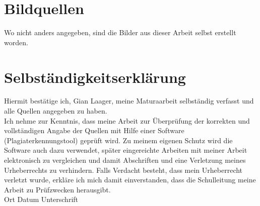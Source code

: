 \documentclass[11pt,DIV=10,final]{scrreprt} %
\begin{document}
\begin{appendix}
{\vspace*{3ex}
{\noindent \large \bfseries src/newtons\_method.rs}


\vspace*{3ex}
{\noindent \large \bfseries src/plot.rs}


\vspace*{3ex}
{\noindent \large \bfseries src/potentials.rs}


\vspace*{3ex}
{\noindent \large \bfseries src/tui.rs}


\vspace*{3ex}
{\noindent \large \bfseries src/turning\_points.rs}


\vspace*{3ex}
{\noindent \large \bfseries src/utils.rs}


\vspace*{3ex}
{\noindent \large \bfseries src/wave\_function\_builder.rs}


\vspace*{3ex}
{\noindent \large \bfseries src/wkb\_wave\_func.rs}


\end{appendix}
\chapter*{Bildquellen}
%
Wo nicht anders angegeben, sind die Bilder aus dieser Arbeit selbst erstellt worden.
%



%
\chapter*{Selbständigkeitserklärung}
%
Hiermit bestätige ich, Gian Laager, meine Maturaarbeit selbständig verfasst und alle Quellen angegeben zu haben.\\\newline
Ich nehme zur Kenntnis, dass meine Arbeit zur Überprüfung der korrekten und vollständigen Angabe der Quellen mit Hilfe einer Software (Plagiaterkennungstool) geprüft wird. Zu meinem eigenen Schutz wird die Software auch dazu verwendet, später eingereichte Arbeiten mit meiner Arbeit elektronisch zu vergleichen und damit Abschriften und eine Verletzung meines Urheberrechts zu verhindern. Falls Verdacht besteht, dass mein Urheberrecht verletzt wurde, erkläre ich mich damit einverstanden, dass die Schulleitung meine Arbeit zu Prüfzwecken herausgibt.\\\newline
Ort\hspace{4cm} Datum\hspace{4cm}  Unterschrift
%
\end{document}
